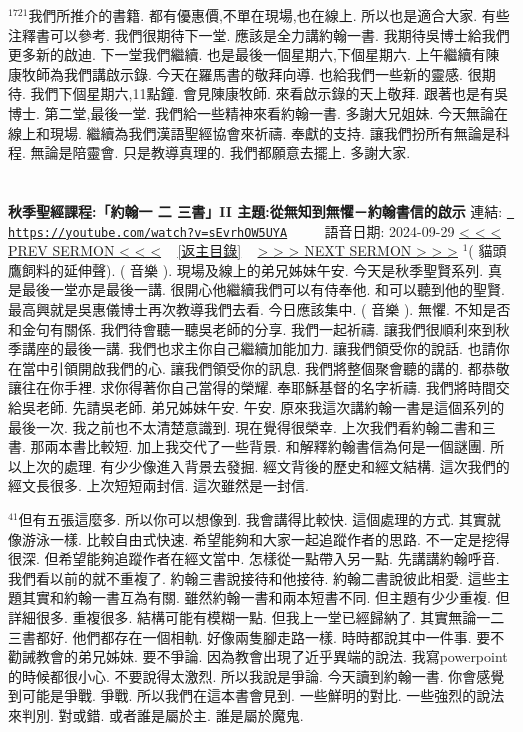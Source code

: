 \documentclass{book}
\begin{document}
$^{1721}$我們所推介的書籍.
都有優惠價,不單在現場,也在線上.
所以也是適合大家.
有些注釋書可以參考.
我們很期待下一堂.
應該是全力講約翰一書.
我期待吳博士給我們更多新的啟迪.
下一堂我們繼續.
也是最後一個星期六,下個星期六.
上午繼續有陳康牧師為我們講啟示錄.
今天在羅馬書的敬拜向導.
也給我們一些新的靈感.
很期待.
我們下個星期六,11點鐘.
會見陳康牧師.
來看啟示錄的天上敬拜.
跟著也是有吳博士.
第二堂,最後一堂.
我們給一些精神來看約翰一書.
多謝大兄姐妹.
今天無論在線上和現場.
繼續為我們漢語聖經協會來祈禱.
奉獻的支持.
讓我們扮所有無論是科程.
無論是陪靈會.
只是教導真理的.
我們都願意去擺上.
多謝大家.
\newpage



\section{}
\label{sec:sEvrhOW5UYA}
\textbf{秋季聖經課程:「約翰一 二 三書」II 主題:從無知到無懼－約翰書信的啟示}
\newline
\newline
連結: \href{https://youtube.com/watch?v=sEvrhOW5UYA}{\texttt{ https://youtube.com/watch?v=sEvrhOW5UYA}} ~~~~ 語音日期: 2024-09-29 
\newline
\newline
\hyperref[sec:x3lU8yQeNU8]{\small{< < < PREV SERMON < < <}}
~
\hyperref[sec:index]{\small{[返主目錄]}}
~
\hyperref[sec:I0XYkK_j_N0]{\small{> > > NEXT SERMON > > >}}
\newline
\newline
$^{1}$( 貓頭鷹飼料的延伸聲).
( 音樂 ).
現場及線上的弟兄姊妹午安.
今天是秋季聖賢系列.
真是最後一堂亦是最後一講.
很開心他繼續我們可以有侍奉他.
和可以聽到他的聖賢.
最高興就是吳惠儀博士再次教導我們去看.
今日應該集中.
( 音樂 ).
無懼.
不知是否和金句有關係.
我們待會聽一聽吳老師的分享.
我們一起祈禱.
讓我們很順利來到秋季講座的最後一講.
我們也求主你自己繼續加能加力.
讓我們領受你的說話.
也請你在當中引領開啟我們的心.
讓我們領受你的訊息.
我們將整個聚會聽的講的.
都恭敬讓往在你手裡.
求你得著你自己當得的榮耀.
奉耶穌基督的名字祈禱.
我們將時間交給吳老師.
先請吳老師.
弟兄姊妹午安.
午安.
原來我這次講約翰一書是這個系列的最後一次.
我之前也不太清楚意識到.
現在覺得很榮幸.
上次我們看約翰二書和三書.
那兩本書比較短.
加上我交代了一些背景.
和解釋約翰書信為何是一個謎團.
所以上次的處理.
有少少像進入背景去發掘.
經文背後的歷史和經文結構.
這次我們的經文長很多.
上次短短兩封信.
這次雖然是一封信.

$^{41}$但有五張這麼多.
所以你可以想像到.
我會講得比較快.
這個處理的方式.
其實就像游泳一樣.
比較自由式快速.
希望能夠和大家一起追蹤作者的思路.
不一定是挖得很深.
但希望能夠追蹤作者在經文當中.
怎樣從一點帶入另一點.
先講講約翰呼音.
我們看以前的就不重複了.
約翰三書說接待和他接待.
約翰二書說彼此相愛.
這些主題其實和約翰一書互為有關.
雖然約翰一書和兩本短書不同.
但主題有少少重複.
但詳細很多.
重複很多.
結構可能有模糊一點.
但我上一堂已經歸納了.
其實無論一二三書都好.
他們都存在一個相軌.
好像兩隻腳走路一樣.
時時都說其中一件事.
要不勸誡教會的弟兄姊妹.
要不爭論.
因為教會出現了近乎異端的說法.
我寫powerpoint的時候都很小心.
不要說得太激烈.
所以我說是爭論.
今天讀到約翰一書.
你會感覺到可能是爭戰.
爭戰.
所以我們在這本書會見到.
一些鮮明的對比.
一些強烈的說法來判別.
對或錯.
或者誰是屬於主.
誰是屬於魔鬼.
\end{document}
